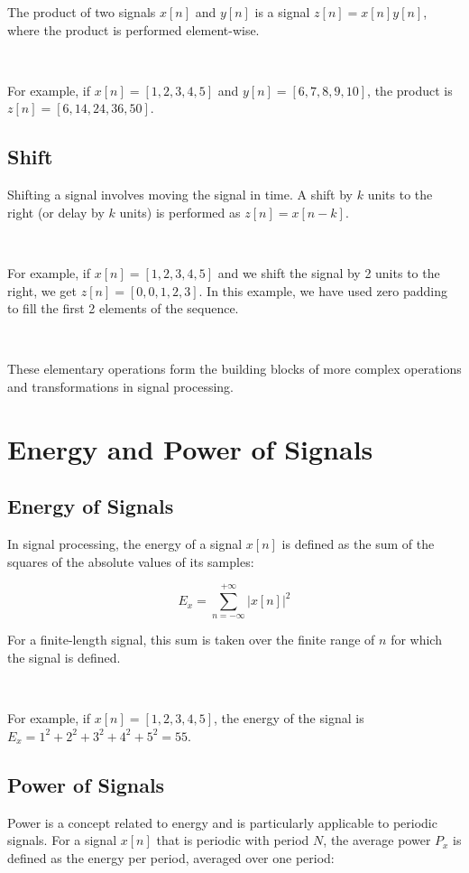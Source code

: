 \documentclass[11pt]{article}
\begin{document}
The product of two signals $x[n]$ and $y[n]$ is a signal $z[n] = x[n] y[n]$, where the product is performed element-wise.

\ 


For example, if $x[n] = [1, 2, 3, 4, 5]$ and $y[n] = [6, 7, 8, 9, 10]$, the product is $z[n] = [6, 14, 24, 36, 50]$.

\subsection*{Shift}

Shifting a signal involves moving the signal in time. A shift by $k$ units to the right (or delay by $k$ units) is performed as $z[n] = x[n-k]$.

\ 


For example, if $x[n] = [1, 2, 3, 4, 5]$ and we shift the signal by 2 units to the right, we get $z[n] = [0, 0, 1, 2, 3]$. In this example, we have used zero padding to fill the first 2 elements of the sequence.

\ 


These elementary operations form the building blocks of more complex operations and transformations in signal processing.

\section*{Energy and Power of Signals}

\subsection*{Energy of Signals}

In signal processing, the energy of a signal $x[n]$ is defined as the sum of the squares of the absolute values of its samples:

\[
E_x = \sum_{n=-\infty}^{+\infty} |x[n]|^2
\]

For a finite-length signal, this sum is taken over the finite range of $n$ for which the signal is defined.

\ 


For example, if $x[n] = [1, 2, 3, 4, 5]$, the energy of the signal is $E_x = 1^2 + 2^2 + 3^2 + 4^2 + 5^2 = 55$.

\subsection*{Power of Signals}

Power is a concept related to energy and is particularly applicable to periodic signals. For a signal $x[n]$ that is periodic with period $N$, the average power $P_x$ is defined as the energy per period, averaged over one period:
\end{document}
